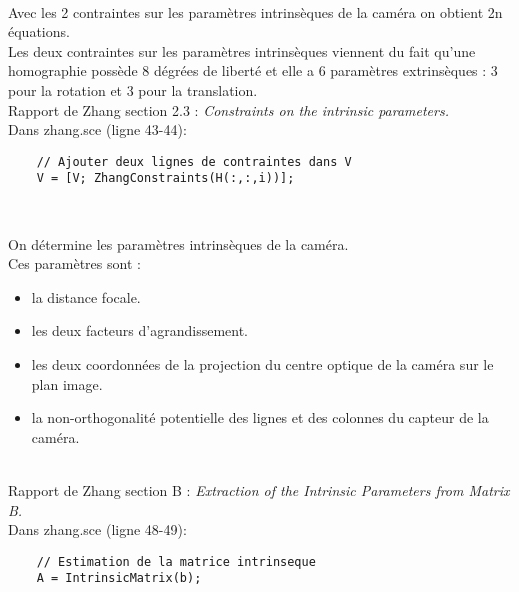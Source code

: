 \documentclass[a4paper,10pt]{article}
\begin{document}
~\\

\begin{paragraph}{Avec les 2 contraintes sur les param\`etres intrins\`eques de la cam\'era on obtient 2n \'equations.}~\\

Les deux contraintes sur les param\`etres intrins\`eques viennent du fait qu'une homographie poss\`ede 8 d\'egr\'ees de libert\'e et elle a 6 param\`etres extrins\`eques : 3 pour la rotation et 3 pour la translation. \\

Rapport de Zhang section 2.3 : \emph{Constraints on the intrinsic parameters.} ~\\

Dans zhang.sce (ligne 43-44):

\begin{Verbatim}
	// Ajouter deux lignes de contraintes dans V
	V = [V; ZhangConstraints(H(:,:,i))];
\end{Verbatim}
\end{paragraph}

~\\

\begin{paragraph}{On d\'etermine les param\`etres intrins\`eques de la cam\'era.} ~\\

Ces param\`etres sont :
\begin{itemize}
\item la distance focale.
\item les deux facteurs d'agrandissement.
\item les deux coordonn\'ees de la projection du centre optique de la cam\'era sur le plan image.
\item la non-orthogonalit\'e potentielle des lignes et des colonnes du capteur de la cam\'era.
\end{itemize}
~\\

Rapport de Zhang section B : \emph{Extraction of the Intrinsic Parameters from Matrix B.} ~\\

Dans zhang.sce (ligne 48-49):

\begin{Verbatim}
	// Estimation de la matrice intrinseque
	A = IntrinsicMatrix(b);
\end{Verbatim}
\end{paragraph}
\end{document}
